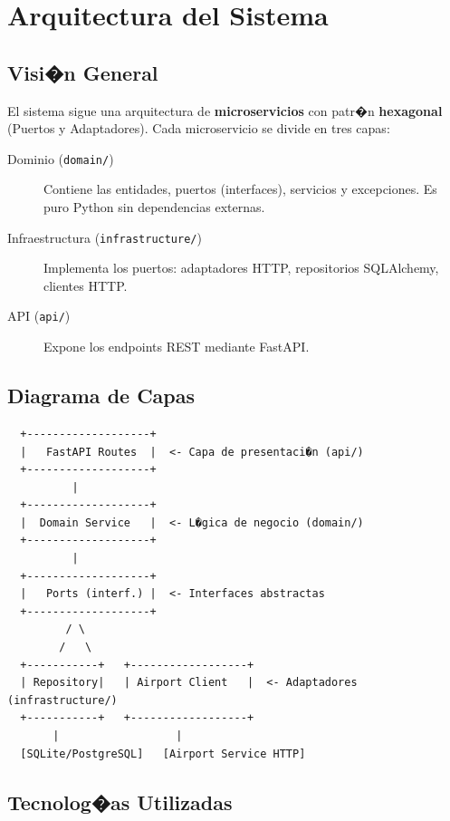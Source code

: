 \documentclass[12pt,a4paper]{article}
\begin{document}
\section{Arquitectura del Sistema}

\subsection{Visi�n General}

El sistema sigue una arquitectura de \textbf{microservicios} con patr�n
\textbf{hexagonal} (Puertos y Adaptadores). Cada microservicio se divide en tres capas:

\begin{description}
  \item[Dominio (\texttt{domain/})] Contiene las entidades, puertos (interfaces),
        servicios y excepciones. Es puro Python sin dependencias externas.
  \item[Infraestructura (\texttt{infrastructure/})] Implementa los puertos:
        adaptadores HTTP, repositorios SQLAlchemy, clientes HTTP.
  \item[API (\texttt{api/})] Expone los endpoints REST mediante FastAPI.
\end{description}

\subsection{Diagrama de Capas}
\vspace{0.3cm}
\begin{verbatim}
  +-------------------+
  |   FastAPI Routes  |  <- Capa de presentaci�n (api/)
  +-------------------+
          |
  +-------------------+
  |  Domain Service   |  <- L�gica de negocio (domain/)
  +-------------------+
          |
  +-------------------+
  |   Ports (interf.) |  <- Interfaces abstractas
  +-------------------+
         / \
        /   \
  +-----------+   +------------------+
  | Repository|   | Airport Client   |  <- Adaptadores (infrastructure/)
  +-----------+   +------------------+
       |                  |
  [SQLite/PostgreSQL]   [Airport Service HTTP]
\end{verbatim}

\subsection{Tecnolog�as Utilizadas}
\end{document}

